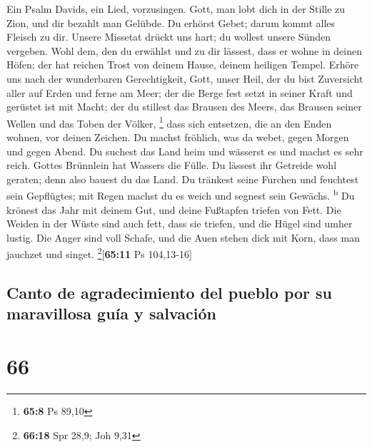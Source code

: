 Ein Psalm Davids, ein Lied, vorzusingen. 
Gott, man lobt dich in der Stille zu Zion, und dir bezahlt man Gelübde.
 Du erhörst Gebet; darum kommt alles Fleisch zu dir.
 Unsere Missetat drückt uns hart; du wollest unsere Sünden
vergeben.  Wohl dem, den du erwählst und zu dir lässest,
dass er wohne in deinen Höfen; der hat reichen Trost von deinem Hause,
deinem heiligen Tempel.  Erhöre uns nach der wunderbaren
Gerechtigkeit, Gott, unser Heil, der du bist Zuversicht aller auf Erden
und ferne am Meer;  der die Berge fest setzt in seiner
Kraft und gerüstet ist mit Macht;  der du stillest das
Brausen des Meers, das Brausen seiner Wellen und das Toben der Völker,
\footnote{\textbf{65:8} Ps 89,10}  dass sich entsetzen,
die an den Enden wohnen, vor deinen Zeichen. Du machst fröhlich, was da
webet, gegen Morgen und gegen Abend.  Du suchest das Land
heim und wässerst es und machst es sehr reich. Gottes Brünnlein hat
Wassers die Fülle. Du lässest ihr Getreide wohl geraten; denn also
bauest du das Land.  Du tränkest seine Furchen und
feuchtest sein Gepflügtes; mit Regen machst du es weich und segnest sein
Gewächs. \textsuperscript{b}  Du krönest das Jahr mit
deinem Gut, und deine Fußtapfen triefen von Fett.  Die
Weiden in der Wüste sind auch fett, dass sie triefen, und die Hügel sind
umher lustig.  Die Anger sind voll Schafe, und die Auen
stehen dick mit Korn, dass man jauchzet und singet.
\footnote{\textbf{66:18} Spr 28,9; Joh 9,31}{[}\textbf{65:11} Ps
104,13-16{]}

\hypertarget{canto-de-agradecimiento-del-pueblo-por-su-maravillosa-guuxeda-y-salvaciuxf3n}{%
\subsection{Canto de agradecimiento del pueblo por su maravillosa guía y
salvación}\label{canto-de-agradecimiento-del-pueblo-por-su-maravillosa-guuxeda-y-salvaciuxf3n}}

\hypertarget{section-65}{%
\section{66}\label{section-65}}

